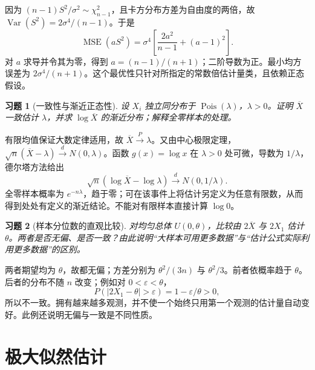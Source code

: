 \documentclass[UTF8,12pt,a4paper,fontset=fandol]{ctexart}
\newtheorem{exercise}{习题}[section]
\begin{document}
\begin{solve}\label{a:B9.6}因为 $(n-1)S^2/\sigma^2\sim\chi^2_{n-1}$，且卡方分布方差为自由度的两倍，故 $\operatorname{Var}(S^2)=2\sigma^4/(n-1)$。于是\[\operatorname{MSE}(aS^2)=\sigma^4\left[\frac{2a^2}{n-1}+(a-1)^2\right].\]对 $a$ 求导并令其为零，得到 $a=(n-1)/(n+1)$；二阶导数为正。最小均方误差为 $2\sigma^4/(n+1)$。这个最优性只针对所指定的常数倍估计量类，且依赖正态假设。\end{solve}

\begin{exercise}[一致性与渐近正态性]\label{q:B9.7}
设 $X_i$ 独立同分布于 $\operatorname{Pois}(\lambda)$，$\lambda>0$。证明 $\overline X$ 一致估计 $\lambda$，并求 $\log\overline X$ 的渐近分布；解释全零样本的处理。\par{}
\end{exercise}

\begin{solve}\label{a:B9.7}有限均值保证大数定律适用，故 $\overline X\xrightarrow{P}\lambda$。又由中心极限定理，$\sqrt n(\overline X-\lambda)\xrightarrow{d}N(0,\lambda)$。函数 $g(x)=\log x$ 在 $\lambda>0$ 处可微，导数为 $1/\lambda$，德尔塔方法给出\[\sqrt n(\log\overline X-\log\lambda)\xrightarrow{d}N(0,1/\lambda).\]全零样本概率为 $e^{-n\lambda}$，趋于零；可在该事件上将估计另定义为任意有限数，从而得到处处有定义的渐近结论。不能对有限样本直接计算 $\log0$。\end{solve}

\begin{exercise}[样本分位数的直观比较]\label{q:B9.8}
对均匀总体 $U(0,\theta)$，比较由 $2\overline X$ 与 $2X_1$ 估计 $\theta$。两者是否无偏、是否一致？由此说明“大样本可用更多数据”与“估计公式实际利用更多数据”的区别。\par{}
\end{exercise}

\begin{solve}\label{a:B9.8}两者期望均为 $\theta$，故都无偏；方差分别为 $\theta^2/(3n)$ 与 $\theta^2/3$。前者依概率趋于 $\theta$。后者的分布不随 $n$ 改变；例如对 $0<\varepsilon<\theta$，\[P(|2X_1-\theta|>\varepsilon)=1-\varepsilon/\theta>0,\]所以不一致。拥有越来越多观测，并不使一个始终只用第一个观测的估计量自动变好。此例还说明无偏与一致是不同性质。\end{solve}

\clearpage\section{极大似然估计}
\end{document}
